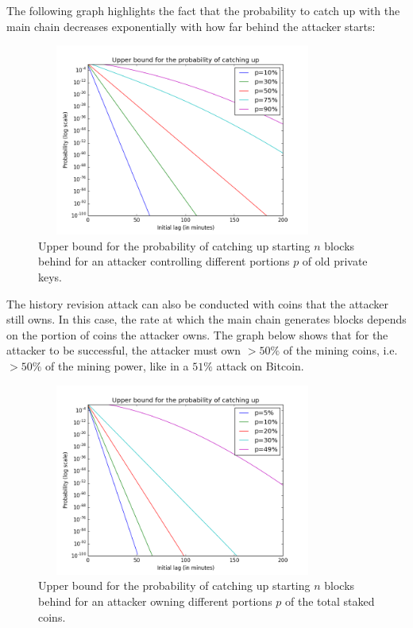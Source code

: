 \documentclass[a4paper,11pt]{article}
\begin{document}
The following graph highlights the fact that the probability to catch up with the main chain decreases exponentially with how far behind the attacker starts:
\begin{figure}[H]
\centering
\includegraphics[width=96mm,height=63mm]{05_upperbound_notowning.png}
\caption{Upper bound for the probability of catching up starting $n$ blocks behind for an attacker controlling different portions $p$ of old private keys.}
\end{figure}

The history revision attack can also be conducted with coins that the attacker still owns. In this case, the rate at which the main chain generates blocks depends on the portion of coins the attacker owns. The graph below shows that for the attacker to be successful, the attacker must own $>50\%$ of the mining coins, i.e. $>50\%$ of the mining power, like in a $51\%$ attack on Bitcoin. 

\begin{figure}[H]
\centering
\includegraphics[width=96mm,height=63mm]{05bis_upperbound_owning.png}
\caption{Upper bound for the probability of catching up starting $n$ blocks behind for an attacker owning different portions $p$ of the total staked coins.}
\end{figure}
\end{document}

